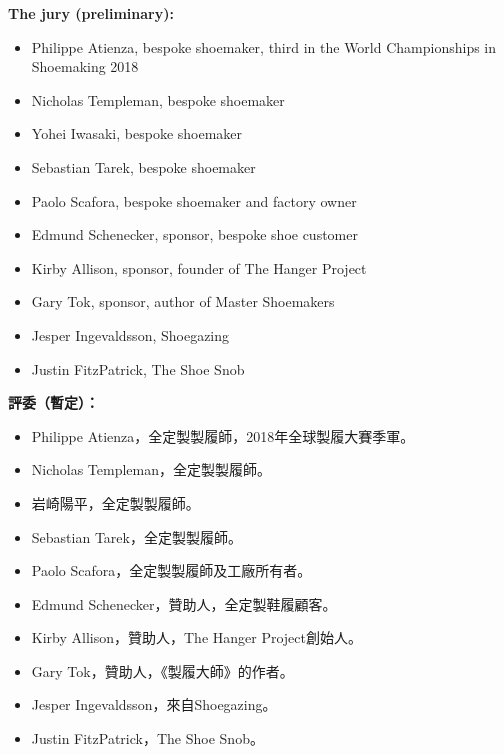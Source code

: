 \begin{paracol}{2}
        \textbf{The jury (preliminary):}
        \begin{itemize}
            \item Philippe Atienza, bespoke shoemaker, third in the World Championships in Shoemaking 2018
            \item Nicholas Templeman, bespoke shoemaker
            \item Yohei Iwasaki, bespoke shoemaker
            \item Sebastian Tarek, bespoke shoemaker
            \item Paolo Scafora, bespoke shoemaker and factory owner
            \item Edmund Schenecker, sponsor, bespoke shoe customer
            \item Kirby Allison, sponsor, founder of The Hanger Project
            \item Gary Tok, sponsor, author of Master Shoemakers
            \item Jesper Ingevaldsson, Shoegazing
            \item Justin FitzPatrick, The Shoe Snob
        \end{itemize}

        \vspace{1em}

        \switchcolumn
        \textbf{評委（暫定）：}
        \begin{itemize}
            \item Philippe Atienza，全定製製履師，2018年全球製履大賽季軍。
            \item Nicholas Templeman，全定製製履師。
            \item 岩崎陽平，全定製製履師。
            \item Sebastian Tarek，全定製製履師。
            \item Paolo Scafora，全定製製履師及工廠所有者。
            \item Edmund Schenecker，贊助人，全定製鞋履顧客。
            \item Kirby Allison，贊助人，The Hanger Project創始人。
            \item Gary Tok，贊助人，《製履大師》的作者。
            \item Jesper Ingevaldsson，來自Shoegazing。
            \item Justin FitzPatrick，The Shoe Snob。
        \end{itemize}
        \switchcolumn*


\end{paracol}
